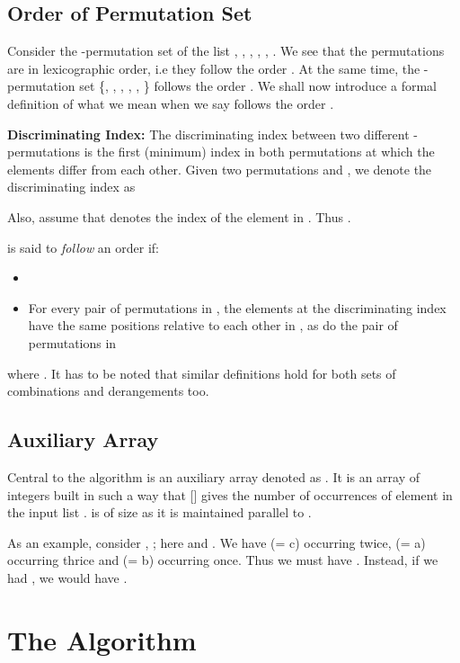 \documentclass{article}
\begin{document}
\subsection{Order of Permutation Set}
\label{sec:order}

Consider the -permutation set of the list , , , , , . We see that the permutations are in lexicographic order, i.e they follow the order . At the same time, the -permutation set \{, , , , , \} follows the order . We shall now introduce a formal definition of what we mean when we say   follows the order .

\noindent \textbf{Discriminating Index:} The discriminating index between two different -permutations is the first (minimum) index in both permutations at which the elements differ from each other. Given two permutations  and , we denote the discriminating index as 

Also, assume that  denotes the index of the element  in . Thus .

 is said to \emph{follow} an order  if:
\begin{itemize}
\item 
\item  For every pair of permutations in , the elements at the discriminating index have the same positions relative to each other in , as do the pair of permutations in  \\

\end{itemize}

where . It has to be noted that similar definitions hold for both sets of combinations and derangements too.

\subsection{Auxiliary Array}
\label{hashorder}

Central to the algorithm is an auxiliary array denoted as . It is an array of integers built in such a way that [] gives the number of occurrences of element  in the {input list }.  is of size  as it is maintained parallel to .

As an example, consider , ; here  and . We have  (= c) occurring twice,  (= a) occurring thrice and  (= b) occurring once. Thus we must have . Instead, if we had , we would have .

\section{The Algorithm}
\label{sec:algo}
\end{document}
